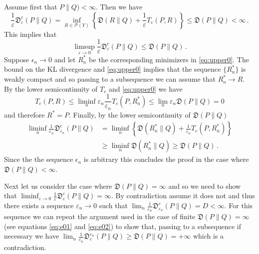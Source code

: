 \documentclass{amsart}
\theoremstyle{definition}
\theoremstyle{remark}
\numberwithin{equation}{section}
\begin{document}
 Assume first that $\mathfrak{}P\|Q) <\infty$.
Then we have 
\begin{equation}\label{eq:upper0}
\frac{1}{\varepsilon} \mathfrak{D}^{c}_{\varepsilon}(P\|Q) = \inf_{R \in \mathcal{P}(Y)} \left\{ \mathfrak{D}(R \|Q) + \frac{1}{\varepsilon} T_c(P,R)\right\} \le 
\mathfrak{D}(P\|Q) < \infty \,.
\end{equation}
This implies that 
\begin{equation}
\limsup_{\varepsilon \to 0}
\frac{1}{\varepsilon} \mathfrak{D}^{c}_{\varepsilon}(P\|Q) \le \mathfrak{D}(P\|Q)\,.
\end{equation}
Suppose $\epsilon_n \to 0$ and let $R_n^*$ 
be the corresponding minimizers in \eqref{eq:upper0}. The bound on the KL divergence and \eqref{eq:upper0} implies that the sequence $\{R^*_n\}$ is weakly compact and so passing to a subsequence we can assume that $R^*_n \to R$. By the lower semicontinuity of $T_c$ and \eqref{eq:upper0} we have 
\begin{equation}\label{eq:e01}
T_c(P,R) \le \liminf_{n}\varepsilon_n \frac{1}{\varepsilon_n}T_c(P,R_n^*)  \le \lim_{n} \varepsilon_n \mathfrak{D}(P\|Q) =0
\end{equation}
and therefore $R^*=P$.  Finally, by the lower semicontinuity of $\mathfrak{D}(P\|Q)$
\begin{equation}\label{eq:e02}
\begin{aligned}
\liminf_{n} \frac{1}{\varepsilon_n} \mathfrak{D}^{c}_{\varepsilon_n}(P\|Q)& =
\liminf_{n}\left\{  \mathfrak{D}(R_n^* \|Q) + \frac{1}{\varepsilon_n} T_c(P, R_n^*)\right\} \\
& \ge \liminf_{n} \mathfrak{D}(R_n^* \|Q) \ge \mathfrak{D}(P\|Q)\,.
\end{aligned}
\end{equation}
Since the the sequence $\epsilon_n$ is arbitrary this concludes the proof in the case where $\mathfrak{D}(P\|Q)< \infty$.


Next let us consider the case where  $\mathfrak{D}(P\|Q) =\infty$ and so we need to show that $\liminf_{\varepsilon \to 0} \frac{1}{\varepsilon} \mathfrak{D}^{c}_{\varepsilon}(P\|Q) = \infty$.  By contradiction assume it does not and thus there exists a sequence $\varepsilon_n \to 0$ such that $\lim_{n} \frac{1}{\varepsilon_n} \mathfrak{D}^{c}_{\varepsilon_n}(P\|Q) =D< \infty$. For this sequence we can repeat the argument used in the case of finite $\mathfrak{D}(P\|Q) =\infty$ (see equations \eqref{eq:e01} and \eqref{eq:e02})
to show that, passing to a subsequence if necessary we have 
$\lim_{n} \frac{1}{\varepsilon_n} \mathfrak{D}_{c}^{\varepsilon_n}(P\|Q) \ge \mathfrak{D}(P\|Q)=+\infty$ which is a contradiction. 
\medskip
\end{document}

